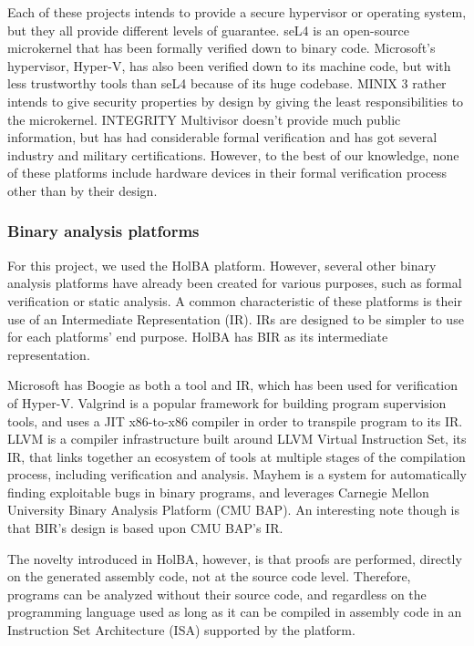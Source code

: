 \documentclass[10pt,a4paper]{article}
\begin{document}
\begin{multicols}{2}
Each of these projects intends to provide a secure hypervisor or operating system, but they all provide different levels of guarantee. seL4 is an open-source microkernel that has been formally verified down to binary code. Microsoft's hypervisor, Hyper-V, has also been verified down to its machine code, but with less trustworthy tools than seL4 because of its huge codebase. MINIX 3 rather intends to give security properties by design by giving the least responsibilities to the microkernel. INTEGRITY Multivisor doesn't provide much public information, but has had considerable formal verification and has got several industry and military certifications. However, to the best of our knowledge, none of these platforms include hardware devices in their formal verification process other than by their design.

\subsubsection{Binary analysis platforms}

For this project, we used the {HolBA} platform. However, several other binary analysis platforms have already been created for various purposes, such as formal verification or static analysis. A common characteristic of these platforms is their use of an Intermediate Representation ({IR}). IRs are designed to be simpler to use for each platforms' end purpose. HolBA has BIR as its intermediate representation.

Microsoft has Boogie as both a tool and IR, which has been used for verification of {Hyper\nobreakdash-\hspace{0pt}V}. Valgrind is a popular framework for building program supervision tools, and uses a JIT x86-to-x86 compiler in order to transpile program to its IR. LLVM is a compiler infrastructure built around LLVM Virtual Instruction Set, its {IR}, that links together an ecosystem of tools at multiple stages of the compilation process, including verification and analysis. Mayhem is a system for automatically finding exploitable bugs in binary programs, and leverages Carnegie Mellon University Binary Analysis Platform (CMU BAP). An interesting note though is that BIR's design is based upon CMU BAP's IR.

The novelty introduced in HolBA, however, is that proofs are performed, directly on the generated assembly code, not at the source code level. Therefore, programs can be analyzed without their source code, and regardless on the programming language used as long as it can be compiled in assembly code in an Instruction Set Architecture ({ISA}) supported by the platform.


\end{multicols}
\end{document}

